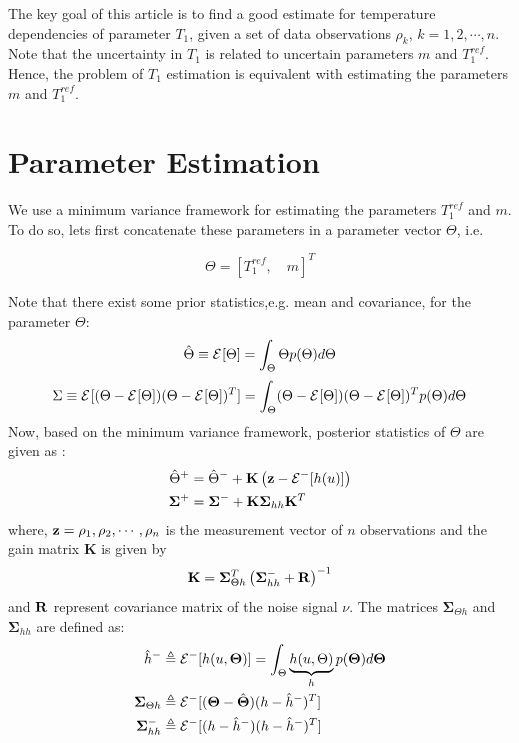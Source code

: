 \documentclass[3p,times]{article}
\begin{document}
The key goal of this article is to find a good estimate for temperature dependencies of parameter $T_1$, given a set of data observations $\rho_k$, $k=1,2,\cdots,n$. Note that the uncertainty in $T_1$ is related to uncertain parameters $m$ and $T_1^{ref}$. Hence, the problem of $T_1$ estimation is equivalent with estimating the parameters $m$ and $T_1^{ref}$.

\section*{Parameter Estimation}\label{sec:est}
We use a minimum variance framework for estimating the parameters $T_1^{ref}$ and $m$. To do so, lets first concatenate these parameters in a parameter vector $\Theta$, i.e.

\[\Theta = [T_1^{ref},\quad m]^T\]\nonumber

Note that there exist some prior statistics,e.g. mean and covariance, for the parameter $\Theta$:
\begin{equation}\label{mean}
\hat{\Theta}\equiv\Ex{\Theta}{}=\int_{\Theta} \Theta p(\Theta)d\Theta
\end{equation}
\begin{equation}\label{covar}
\Sigma\equiv\Ex{(\Theta-\Ex{\Theta}{})(\Theta-\Ex{\Theta}{})^T}{}=\int_{\Theta} (\Theta-\Ex{\Theta}{})(\Theta-\Ex{\Theta}{})^T p(\Theta)d\Theta
\end{equation}
Now, based on the minimum variance framework, posterior statistics of $\Theta$ are given as \cite{Madankan_jcp,madankan_jgcd}:
\begin{align}
\hat{\Theta}^+&=\hat{\Theta}^- + \mathbf{K}\left(\z-\Ex{h(u)}{-}\right)\label{minvar_mean}\\
\boldsymbol{\Sigma}^+& = \boldsymbol{\Sigma}^- + \mathbf{K} \boldsymbol{\Sigma}_{hh}\mathbf{K}^T\label{minvar_var}
\end{align}
where, $\z={\rho_1,\rho_2, \cdots, \rho_n}$ is the measurement vector of $n$ observations and the gain matrix $\mathbf{K}$ is given by
\begin{equation}
\mathbf{K} = \boldsymbol{\Sigma}_{\Theta h}^T\left(\boldsymbol{\Sigma}_{hh}^-+\v{R}\right)^{-1}\label{Kgain}
\end{equation}
and $\v{R}$ represent covariance matrix of the noise signal $\nu$. The matrices $\boldsymbol{\Sigma}_{\Theta h}$ and $\boldsymbol{\Sigma}_{hh}$ are defined as:
\begin{align}
\hat{h}^-&\triangleq \Ex{h(u,\Teta)}{-}=\int_{\Theta}\underbrace{h(u,\Theta)}_{h}p(\Teta)d\Teta\label{h_k}\\
\boldsymbol{\Sigma}_{\Theta h} & \triangleq\Ex{(\Teta-\hat{\Teta})(h-\hat{h}^-)^T}{-}\label{Pzy}\\
\boldsymbol{\Sigma}_{hh}^- &\triangleq \Ex{(h-\hat{h}^-)(h-\hat{h}^-)^T}{-}\label{Pzz}
\end{align}
\end{document}
